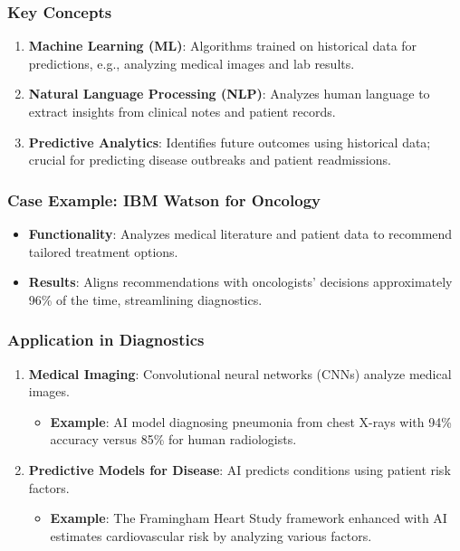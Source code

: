 \documentclass[aspectratio=169]{beamer}
\begin{document}
\begin{frame}[fragile]
    \frametitle{Key Concepts}
    \begin{enumerate}
        \item \textbf{Machine Learning (ML)}: Algorithms trained on historical data for predictions, e.g., analyzing medical images and lab results.
        
        \item \textbf{Natural Language Processing (NLP)}: Analyzes human language to extract insights from clinical notes and patient records.
        
        \item \textbf{Predictive Analytics}: Identifies future outcomes using historical data; crucial for predicting disease outbreaks and patient readmissions.
    \end{enumerate}
\end{frame}

\begin{frame}[fragile]
    \frametitle{Case Example: IBM Watson for Oncology}
    \begin{itemize}
        \item \textbf{Functionality}: Analyzes medical literature and patient data to recommend tailored treatment options.
        
        \item \textbf{Results}: Aligns recommendations with oncologists' decisions approximately 96\% of the time, streamlining diagnostics.
    \end{itemize}
\end{frame}

\begin{frame}[fragile]
    \frametitle{Application in Diagnostics}
    \begin{enumerate}
        \item \textbf{Medical Imaging}: Convolutional neural networks (CNNs) analyze medical images. 
        \begin{itemize}
            \item \textbf{Example}: AI model diagnosing pneumonia from chest X-rays with 94\% accuracy versus 85\% for human radiologists.
        \end{itemize}
        
        \item \textbf{Predictive Models for Disease}: AI predicts conditions using patient risk factors.
        \begin{itemize}
            \item \textbf{Example}: The Framingham Heart Study framework enhanced with AI estimates cardiovascular risk by analyzing various factors.
        \end{itemize}
    \end{enumerate}
\end{frame}
\end{document}
